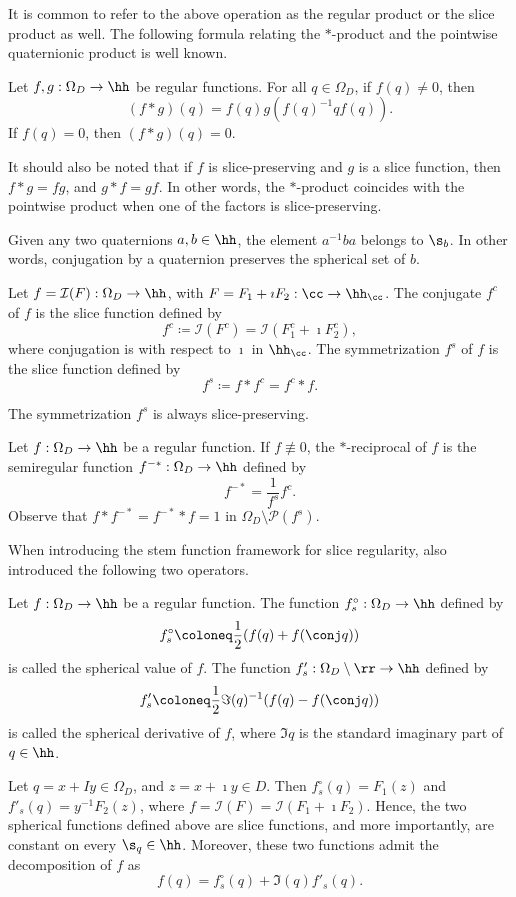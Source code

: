 \documentclass{amsart}
\begin{document}
It is common to refer to the above operation as the regular product or the slice product as well. The following formula relating the $*$-product and the pointwise quaternionic product is well known. 

\begin{prop}
    Let $f,g:\Omega_D\to\hh$ be regular functions. For all $q\in\Omega_D$, if $f(q)\neq0$, then \[(f*g)(q)=f(q)g(f(q)^{-1}qf(q)).\] If $f(q)=0$, then $(f*g)(q)=0$.  
\end{prop}

It should also be noted that if $f$ is slice-preserving and $g$ is a slice function, then $f*g=fg$, and $g*f=gf$. In other words, the $*$-product coincides with the pointwise product when one of the factors is slice-preserving.

\begin{remark}
    Given any two quaternions $a,b\in\hh$, the element $a^{-1}ba$ belongs to $\s_b$. 
    In other words, conjugation by a quaternion preserves the spherical set of $b$.
\end{remark}

\begin{defin}
    Let $f=\mathcal{I}(F):\Omega_D\to\hh$, with $F=F_1+\imath F_2:\cc \to\hh_\cc$. The conjugate $f^c$ of $f$ is the slice function defined by \[f^c\coloneq \mathcal{I}(F^c)=\mathcal{I}(F_1^c+\imath F_2^c),\] where conjugation is with respect to $\imath$ in $\hh_\cc$. The symmetrization $f^s$ of $f$ is the slice function defined by \[f^s\coloneq f*f^c=f^c*f.\]  
\end{defin}

\begin{remark}
    The symmetrization $f^s$ is always slice-preserving. 
\end{remark}

\begin{defin}
    Let $f:\Omega_D\to\hh$ be a regular function. If $f\not\equiv 0$, the $*$-reciprocal of $f$ is the semiregular function $f^{-*}:\Omega_D\to\hh$ defined by \[f^{-*}=\frac{1}{f^s}f^c.\] Observe that $f*f^{-*}=f^{-*}*f=1$ in $\Omega_D\setminus{\mathcal{P}(f^s)}$. 
\end{defin}

When introducing the stem function framework for slice regularity, \cite{Ghiloni_2011} also introduced the following two operators. 
\begin{defin}
    Let $f:\Omega_D\to\hh$ be a regular function. The function $f^\circ_s : \Omega_D \to \hh$ defined by \[f^\circ_s\coloneq \frac{1}{2}(f(q)+f(\conj q))\] is called the spherical value of $f$. The function $f_s':\Omega_D\setminus\rr\to \hh$ defined by \[f'_s\coloneq \frac12 \Im(q)^{-1}(f(q)-f(\conj q))\] is called the spherical derivative of $f$, where $\Im q$ is the standard imaginary part of $q\in\hh$.  
\end{defin}
Let $q=x +Iy\in\Omega_D$, and $z=x +\imath y\in D$. Then $f^\circ_s(q)=F_1(z)$ and $f'_s(q)=y^{-1}F_2(z)$, where $f=\mathcal I (F)=\mathcal I (F_1+\imath F_2)$. Hence, the two spherical functions defined above are slice functions, and more importantly, are constant on every $\s_q\in\hh$. Moreover, these two functions admit the decomposition of $f$ as \[f(q)=f^\circ_s(q)+\Im (q)f'_s(q).\]
\end{document}

